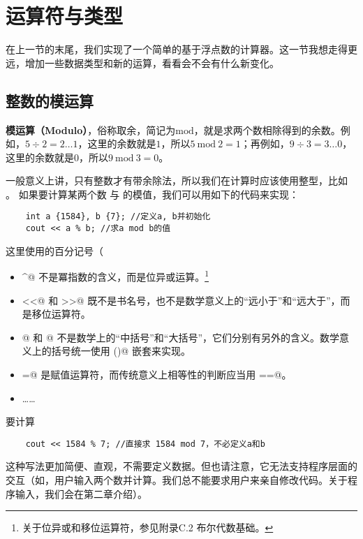 \section{运算符与类型}
在上一节的末尾，我们实现了一个简单的基于浮点数的计算器。这一节我想走得更远，增加一些数据类型和新的运算，看看会不会有什么新变化。\par
\subsection*{整数的模运算}
\textbf{模运算（Modulo）}，俗称取余，简记为$\mathrm{mod}$，就是求两个数相除得到的余数。例如，$5\div2=2\ldots1$，这里的余数就是$1$，所以$5\:\mathrm{mod}\:2=1$；再例如，$9\div3=3\ldots0$，这里的余数就是$0$，所以$9\:\mathrm{mod}\:3=0$。\par
一般意义上讲，只有整数才有带余除法，所以我们在计算时应该使用整型，比如 \lstinline@int@。
如果要计算某两个数 \lstinline@a@ 与 \lstinline@b@ 的模值，我们可以用如下的代码来实现：
\begin{lstlisting}
    int a {1584}, b {7}; //定义a, b并初始化
    cout << a % b; //求a mod b的值
\end{lstlisting}
这里使用的百分记号（\lstinline@%@）可能会让人费解。其实在C++中，\lstinline@%@ 并不是百分记号，而是取模运算符，含义是左边整数除以右边整数得到的余数（模值）。在各类编程语言中，这种``记号含义与传统含义不同''的现象比比皆是，以下是C++当中的部分例子（读者无需现在就掌握，但日后要留心）：
\begin{itemize}
    \item \lstinline@^@ 不是冪指数的含义，而是位异或运算。\footnote{关于位异或和移位运算符，参见附录C.2 布尔代数基础。}%
    \item \lstinline@<<@ 和 \lstinline@>>@ 既不是书名号，也不是数学意义上的``远小于''和``远大于''，而是移位运算符。
    \item \lstinline@[]@ 和 \lstinline@{}@ 不是数学上的``中括号''和``大括号''，它们分别有另外的含义。数学意义上的括号统一使用 \lstinline@()@ 嵌套来实现。
    \item \lstinline@=@ 是赋值运算符，而传统意义上相等性的判断应当用 \lstinline@==@。
    \item \dots\dots
\end{itemize}\par
要计算 %
\begin{lstlisting}
    cout << 1584 % 7; //直接求 1584 mod 7，不必定义a和b
\end{lstlisting}
这种写法更加简便、直观，不需要定义数据。但也请注意，它无法支持程序层面的交互（如，用户输入两个数并计算。我们总不能要求用户来亲自修改代码。关于程序输入，我们会在第二章介绍）。\par
